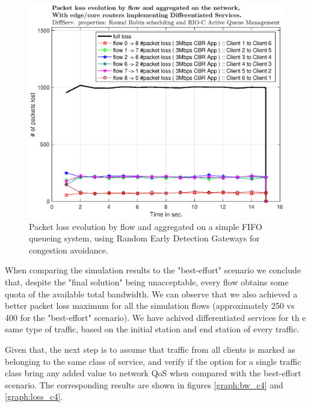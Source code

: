 \documentclass[conference,compsoc]{IEEEtran}
\begin{document}
     \begin{figure}[H]
     \centering
     \includegraphics[width=1\columnwidth]{EPS/C/loss_c3.eps}
     \caption{Packet loss evolution by flow and aggregated on a simple FIFO queueing system, using Random Early Detection Gateways for congestion avoidance.}
     \label{graph:loss_c3}
     \end{figure}

When comparing the simulation results to the "best-effort" scenario we conclude that, despite the "final solution" being unacceptable, every flow obtains some quota of the available total bandwidth. We can observe that we also achieved a better packet loss maximum for all the simulation flows (approximately 250 vs 400 for the "best-effort" scenario). We have achived differentiated services for th
e same type of traffic, based on the initial station and end station of every traffic. \par
Given that, the next step is to assume that traffic from all clients is marked as belonging to the same class of service, and verify if the option for a single traffic class bring any added value to network QoS when compared with the best-effort scenario. 
The corresponding results are shown in figures \ref{graph:bw_c4} and \ref{graph:loss_c4}.
\end{document}

